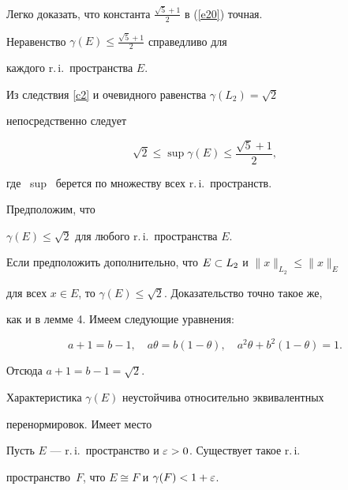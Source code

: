 Легко доказать, что константа $\frac {\sqrt 5 +1} 2 $ в (\ref{e20}) точная.





\begin{cor}\label{c2}


Неравенство $\gamma(E) \le \frac {\sqrt 5 +1} 2 $ справедливо для 


каждого r.\,i.\ пространства $E$.


\end{cor}





Из следствия \ref{c2} и очевидного равенства $\gamma(L_2) = \sqrt 2$ 


непосредственно следует


$$


\sqrt 2 \le \sup \gamma (E) \le \frac {\sqrt 5 +1} 2,


$$


где \ sup \ берется по множеству всех r.\,i.\ пространств. 


Предположим, что


$\gamma(E) \le \sqrt 2$ для любого r.\,i.\ пространства $E$. 


Если предположить дополнительно, что $E\subset L_2$ и $\|x\|_{L_2} \le \|x\|_E$


для всех $x\in E$, то $\gamma(E) \le \sqrt 2$. Доказательство точно такое же,


как и в лемме 4. Имеем следующие уравнения:


$$


a+1 = b-1,\quad


a\theta = b(1- \theta),\quad


a^2 \theta + b^2 (1-\theta) =1.


$$


Отсюда $a+1 = b-1 = \sqrt 2$. 





Характеристика $\gamma(E)$ неустойчива относительно эквивалентных 


перенормировок. Имеет место





\begin{thm}\label{t6}


Пусть $E$ --- r.\,i.\ пространство и $\varepsilon >0$. Существует такое r.\,i.\ 


пространство~$F$, что $E \cong F$ и $\gamma(F) < 1 + \varepsilon$. 


\end{thm}





